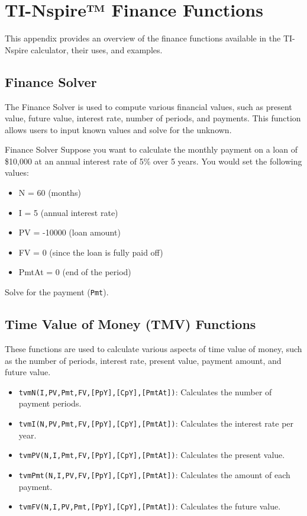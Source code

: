 \section{TI-Nspire™ Finance Functions}
This appendix provides an overview of the finance functions available in the TI-Nspire calculator, their uses, and examples.

\subsection{Finance Solver}
The Finance Solver is used to compute various financial values, such as present value, future value, interest rate, number of periods, and payments. This function allows users to input known values and solve for the unknown.

\begin{examplebox}{Finance Solver}
Suppose you want to calculate the monthly payment on a loan of \$10,000 at an annual interest rate of 5\% over 5 years. 
You would set the following values:
\begin{itemize}
    \item N = 60 (months)
    \item I = 5 (annual interest rate)
    \item PV = -10000 (loan amount)
    \item FV = 0 (since the loan is fully paid off)
    \item PmtAt = 0 (end of the period)
\end{itemize}
Solve for the payment (\texttt{Pmt}).
\end{examplebox}

\subsection{Time Value of Money (TMV) Functions}
These functions are used to calculate various aspects of time value of money, such as the number of periods, interest rate, present value, payment amount, and future value.

\begin{itemize}
    \item \texttt{tvmN(I,PV,Pmt,FV,[PpY],[CpY],[PmtAt])}: Calculates the number of payment periods.
    \item \texttt{tvmI(N,PV,Pmt,FV,[PpY],[CpY],[PmtAt])}: Calculates the interest rate per year.
    \item \texttt{tvmPV(N,I,Pmt,FV,[PpY],[CpY],[PmtAt])}: Calculates the present value.
    \item \texttt{tvmPmt(N,I,PV,FV,[PpY],[CpY],[PmtAt])}: Calculates the amount of each payment.
    \item \texttt{tvmFV(N,I,PV,Pmt,[PpY],[CpY],[PmtAt])}: Calculates the future value.
\end{itemize}

